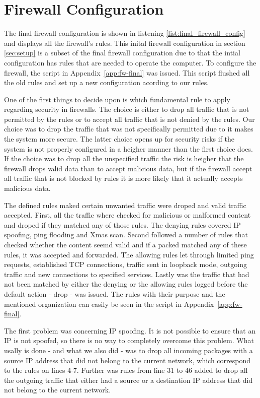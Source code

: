 \section{Firewall Configuration}
\label{sec:config}

The final firewall configuration is shown in listening \ref{list:final_firewall_config} and displays all the firewall's rules. This inital firewall configuration in section \ref{sec:setup} is a subset of the final firewall configuration due to that the intial configuration has rules that are needed to operate the computer. To configure the firewall, the script in Appendix~\ref{app:fw-final} was issued. This script flushed all the old rules and set up a new configuration acording to our rules. 

One of the first things to decide upon is which fundamental rule to apply regarding security in firewalls. The choice is either to drop all traffic that is not permitted by the rules or to accept all traffic that is not denied by the rules. Our choice was to drop the traffic that was not specifically permitted due to it makes the system more secure. The latter choice opens up for security risks if the system is not properly configured in a heigher manner than the first choice does. If the choice was to drop all the unspecified traffic the risk is heigher that the firewall drops valid data than to accept malicious data, but if the firewall accept all traffic that is not blocked by rules it is more likely that it actually accepts malicious data.

The defined rules maked certain unwanted traffic were droped and valid traffic accepted. First, all the traffic where checked for malicious or malformed content and droped if they matched any of those rules. The denying rules covered IP spoofing, ping flooding and Xmas scan. Second followed a number of rules that checked whether the content seemd valid and if a packed matched any of these rules, it was accepted and forwarded. The allowing rules let through limited ping requests, established TCP connections, traffic sent in loopback mode, outgoing traffic and new connections to specified services. Lastly was the traffic that had not been matched by either the denying or the allowing rules logged before the default action - drop - was issued. The rules with their purpose and the mentioned organization can easily be seen in the script in Appendix~\ref{app:fw-final}.

The first problem was concerning IP spoofing. It is not possible to ensure that an IP is not spoofed, so there is no way to completely overcome this problem. What usally is done - and what we also did - was to drop all incoming packages with a source IP address that did not belong to the current network, which correspond to the rules on lines 4-7. Further was rules from line 31 to 46 added to drop all the outgoing traffic that either had a source or a destination IP address that did not belong to the current network. 

